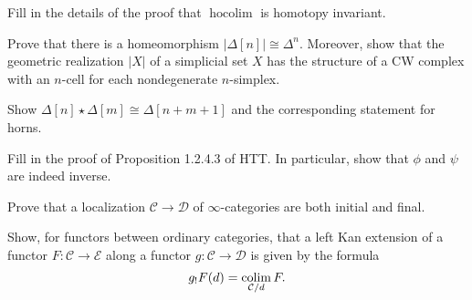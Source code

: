 \documentclass{amsart}
\DeclareMathOperator{\hocolim}{hocolim}
\begin{document}
\begin{exercise}
    Fill in the details of the proof that $\hocolim$ is homotopy invariant.
\end{exercise}

\begin{exercise}
    Prove that there is a homeomorphism $|\Delta[n]|\cong \Delta^n$. Moreover, show that
    the geometric realization $|X|$ of a simplicial set $X$ has the structure of a CW
    complex with an $n$-cell for each nondegenerate $n$-simplex.
\end{exercise}

\begin{exercise}
    Show $\Delta[n]\star \Delta[m]\cong \Delta[n+m+1]$ and the corresponding statement
    for horns.
\end{exercise}

\begin{exercise}
    Fill in the proof of Proposition 1.2.4.3 of HTT. In particular, show that $\phi$ and
    $\psi$ are indeed inverse.
\end{exercise}

\begin{exercise}
    Prove that a localization $\mathcal{C}\to \mathcal{D}$ of $\infty$-categories are
    both initial and final.
\end{exercise}

\begin{exercise}
    Show, for functors between ordinary categories, that a left Kan extension of a
    functor $F:\mathcal{C}\to \mathcal{E}$ along a functor $g:\mathcal{C}\to \mathcal{D}$
    is given by the formula
    \begin{equation*}
        g_!F(d) = \operatorname*{colim}_{\mathcal{C}/d} F.
    \end{equation*}
\end{exercise}


\newpage




\end{document}
